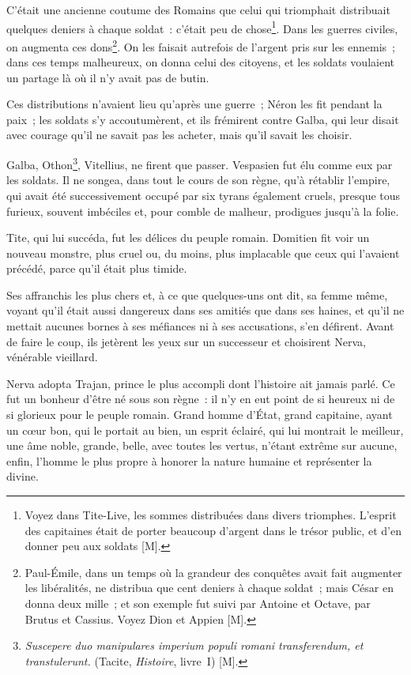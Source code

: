 \documentclass[french,twoside]{book} %
\begin{document}
C’était une ancienne coutume des Romains que celui qui triomphait distribuait quelques deniers à chaque soldat : c’était peu de chose\footnote{Voyez dans Tite-Live, les sommes distribuées dans divers triomphes. L’esprit des capitaines était de porter beaucoup d’argent dans le trésor public, et d’en donner peu aux soldats [M].}. Dans les guerres civiles, on augmenta ces dons\footnote{Paul-Émile, dans un temps où la grandeur des conquêtes avait fait augmenter les libéralités, ne distribua que cent deniers à chaque soldat ; mais César en donna deux mille ; et son exemple fut suivi par Antoine et Octave, par Brutus et Cassius. Voyez Dion et Appien [M].}. On les faisait autrefois de l’argent pris sur les ennemis ; dans ces temps malheureux, on donna celui des citoyens, et les soldats voulaient un partage là où il n’y avait pas de butin.\par
Ces distributions n’avaient lieu qu’après une guerre ; Néron les fit pendant la paix ; les soldats s’y accoutumèrent, et ils frémirent contre Galba, qui leur disait avec courage qu’il ne savait pas les acheter, mais qu’il savait les choisir.\par
Galba, Othon\footnote{{\itshape Suscepere duo manipulares imperium populi romani transferendum, et transtulerunt.} (Tacite, {\itshape Histoire}, livre I) [M].}, Vitellius, ne firent que passer. Vespasien fut élu comme eux par les soldats. Il ne songea, dans tout le cours de son règne, qu’à rétablir l’empire, qui avait été successivement occupé par six tyrans également cruels, presque tous furieux, souvent imbéciles et, pour comble de malheur, prodigues jusqu’à la folie.\par
Tite, qui lui succéda, fut les délices du peuple romain. Domitien fit voir un nouveau monstre, plus cruel ou, du moins, plus implacable que ceux qui l’avaient précédé, parce qu’il était plus timide.\par
Ses affranchis les plus chers et, à ce que quelques-uns ont dit, sa femme même, voyant qu’il était aussi dangereux dans ses amitiés que dans ses haines, et qu’il ne mettait aucunes bornes à ses méfiances ni à ses accusations, s’en défirent. Avant de faire le coup, ils jetèrent les yeux sur un successeur et choisirent Nerva, vénérable vieillard.\par
Nerva adopta Trajan, prince le plus accompli dont l’histoire ait jamais parlé. Ce fut un bonheur d’être né sous son règne : il n’y en eut point de si heureux ni de si glorieux pour le peuple romain. Grand homme d’État, grand capitaine, ayant un cœur bon, qui le portait au bien, un esprit éclairé, qui lui montrait le meilleur, une âme noble, grande, belle, avec toutes les vertus, n’étant extrême sur aucune, enfin, l’homme le plus propre à honorer la nature humaine et représenter la divine.\par
\end{document}
